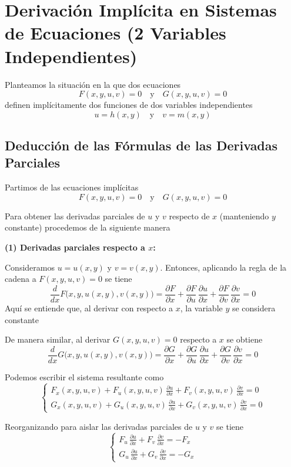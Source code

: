 \documentclass{article}
\begin{document}
\section*{Derivación Implícita en Sistemas de Ecuaciones (2 Variables Independientes)}

Planteamos la situación en la que dos ecuaciones
\[
F(x,y,u,v)=0 \quad \text{y} \quad G(x,y,u,v)=0
\]
definen implícitamente dos funciones de dos variables independientes
\[
u = h(x,y) \quad \text{y} \quad v = m(x,y)
\]

\subsection*{Deducción de las Fórmulas de las Derivadas Parciales}

Partimos de las ecuaciones implícitas
\[
F(x,y,u,v)=0 \quad \text{y} \quad G(x,y,u,v)=0
\]

Para obtener las derivadas parciales de \( u \) y \( v \) respecto de \( x \) (manteniendo \( y \) constante) procedemos de la siguiente manera

\medskip
\noindent \textbf{(1) Derivadas parciales respecto a \( x \):}

Consideramos \( u = u(x,y) \) y \( v = v(x,y) \). Entonces, aplicando la regla de la cadena a \( F(x,y,u,v)=0 \) se tiene
\[
\frac{d}{dx}F\bigl(x,y,u(x,y),v(x,y)\bigr)
=\frac{\partial F}{\partial x}+ \frac{\partial F}{\partial u}\,\frac{\partial u}{\partial x}+ \frac{\partial F}{\partial v}\,\frac{\partial v}{\partial x}=0
\]
Aquí se entiende que, al derivar con respecto a \( x \), la variable \( y \) se considera constante

De manera similar, al derivar \( G(x,y,u,v)=0 \) respecto a \( x \) se obtiene
\[
\frac{d}{dx}G\bigl(x,y,u(x,y),v(x,y)\bigr)
=\frac{\partial G}{\partial x}+ \frac{\partial G}{\partial u}\,\frac{\partial u}{\partial x}+ \frac{\partial G}{\partial v}\,\frac{\partial v}{\partial x}=0
\]

Podemos escribir el sistema resultante como
\[
\begin{cases}
F_x(x,y,u,v)+ F_u(x,y,u,v)\,\frac{\partial u}{\partial x}+ F_v(x,y,u,v)\,\frac{\partial v}{\partial x}=0 \\
G_x(x,y,u,v)+ G_u(x,y,u,v)\,\frac{\partial u}{\partial x}+ G_v(x,y,u,v)\,\frac{\partial v}{\partial x}=0
\end{cases}
\]

Reorganizando para aislar las derivadas parciales de \( u \) y \( v \) se tiene
\[
\begin{cases}
F_u\,\frac{\partial u}{\partial x}+ F_v\,\frac{\partial v}{\partial x}=-F_x \\
G_u\,\frac{\partial u}{\partial x}+ G_v\,\frac{\partial v}{\partial x}=-G_x
\end{cases}
\]
\end{document}
